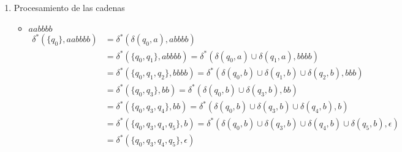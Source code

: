 \documentclass{article}
\begin{document}
\begin{enumerate}
{\begin{itemize}
\begin{enumerate}
                $  $\\
                
                $  $\\
                
                $  $\\
                
                $  $\\
                    \item {
                        Procesamiento de las cadenas
                        \begin{itemize}
                            \item {
                                $aabbbb$
                                \begin{align*}
                                    \delta^{*}(\{q_{0}\}, aabbbb) 
                                    &= \delta^{*}(\delta(q_{0}, a), abbbb) \\
                                    &= \delta^{*}(\{q_{0}, q_{1}\}, abbbb) 
                                    = \delta^{*}(\delta(q_{0}, a) 
                                    \cup \delta(q_{1}, a), bbbb) \\
                                    &= \delta^{*}(\{q_{0}, q_{1}, q_{2}\}, bbbb)
                                    = \delta^{*}(\delta(q_{0}, b) 
                                    \cup \delta(q_{1}, b) 
                                    \cup \delta(q_{2}, b), bbb) \\
                                    &= \delta^{*}(\{q_{0}, q_{3}\}, bb)
                                    = \delta^{*}(\delta(q_{0}, b) 
                                    \cup \delta(q_{3}, b), bb) \\
                                    &= \delta^{*}(\{q_{0}, q_{3}, q_{4}\}, bb)
                                    = \delta^{*}(\delta(q_{0}, b) 
                                    \cup \delta(q_{3}, b) 
                                    \cup \delta(q_{4}, b), b) \\
                                    &= \delta^{*}(\{q_{0}, q_{3}, q_{4}, q_{5}\}, b)
                                    = \delta^{*}(\delta(q_{0}, b) 
                                    \cup \delta(q_{3}, b) 
                                    \cup \delta(q_{4}, b)
                                    \cup \delta(q_{5}, b), \epsilon) \\
                                    &= \delta^{*}(\{q_{0}, q_{3}, q_{4}, q_{5}\}, \epsilon)

\end{align*}}
\end{itemize}}
\end{enumerate}
\end{itemize}}
\end{enumerate}
\end{document}
